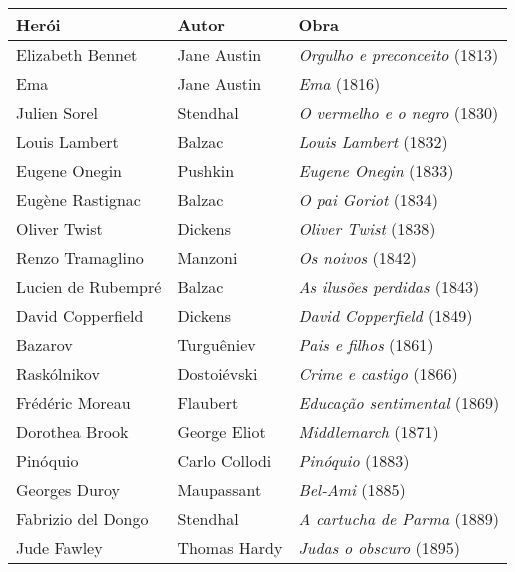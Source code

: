 \begin{footnotesize}
\begin{center}
\begin{tabular}{lll}
Herói             & Autor 		& Obra \\\hline
Elizabeth Bennet  & Jane Austin  	& \textit{Orgulho e preconceito} (1813)\\
Ema               & Jane Austin 	& \textit{Ema} (1816)\\
Julien Sorel      & Stendhal 		& \textit{O vermelho e o negro} (1830) \\
Louis Lambert     & Balzac 		& \textit{Louis Lambert} (1832)\\
Eugene Onegin     & Pushkin 		& \textit{Eugene Onegin} (1833) \\
Eugène Rastignac  & Balzac 		& \textit{O pai Goriot} (1834) \\
Oliver Twist      & Dickens 		& \textit{Oliver Twist} (1838) \\
Renzo Tramaglino  & Manzoni 		& \textit{Os noivos} (1842) \\
Lucien de Rubempré& Balzac 		& \textit{As ilusões perdidas} (1843) \\
David Copperfield & Dickens 		& \textit{David Copperfield} (1849) \\
Bazarov           & Turguêniev	 	& \textit{Pais e filhos} (1861) \\
Raskólnikov       & Dostoiévski 	& \textit{Crime e castigo} (1866) \\
Frédéric Moreau   & Flaubert 		& \textit{Educação sentimental} (1869) \\ 
Dorothea Brook    & George Eliot 	& \textit{Middlemarch} (1871) \\ 
Pinóquio          & Carlo Collodi 	& \textit{Pinóquio} (1883) \\
Georges Duroy     & Maupassant	 	& \textit{Bel-Ami} (1885) \\
Fabrizio del Dongo& Stendhal 		& \textit{A cartucha de Parma} (1889) \\
Jude Fawley       & Thomas Hardy 	& \textit{Judas o obscuro} (1895) 
\end{tabular}
\end{center}
\end{footnotesize}

